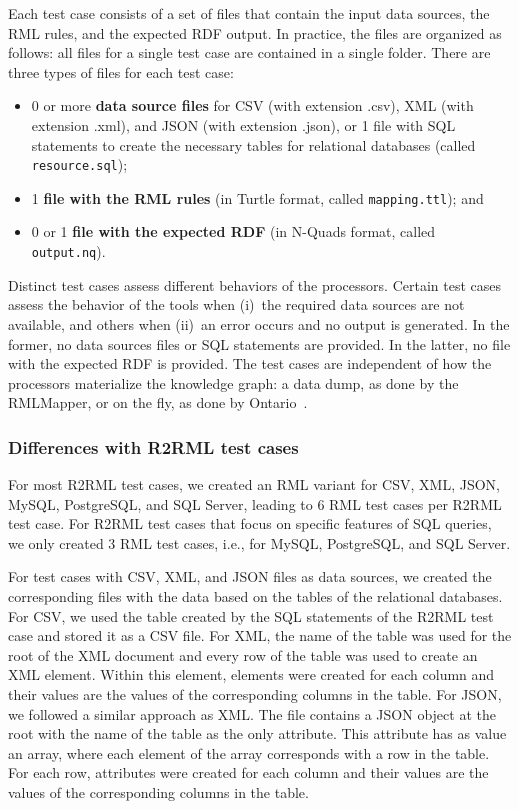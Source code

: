 Each test case consists of a set of files that contain the input data sources, the RML rules, and the expected RDF output. In practice, the files are organized as follows: all files for a single test case are contained in a single folder. There are three types of files for each test case:

\begin{itemize}
  \item 0 or more \textbf{data source files} for CSV (with extension .csv), XML (with extension .xml), and JSON (with extension .json), or 
  1 file with SQL statements to create the necessary tables for relational databases (called \verb|resource.sql|);
  \item 1 \textbf{file with the RML rules} (in Turtle format, called \verb|mapping.ttl|); and
  \item 0 or 1 \textbf{file with the expected RDF} (in N-Quads format, called \verb|output.nq|).
\end{itemize}

Distinct test cases assess different behaviors of the processors. Certain test cases assess the behavior of the tools when (i)~the required data sources are not available, and others when (ii)~an error occurs and no output is generated. In the former, no data sources files or SQL statements are provided. In the latter, no file with the expected RDF is provided. The test cases are independent of how the processors materialize the knowledge graph: a data dump, as done by the RMLMapper, or on the fly, as done by Ontario~\citep{endris2019ontario}.

\subsubsection{Differences with R2RML test cases}
For most R2RML test cases, we created an RML variant for CSV, XML, JSON, MySQL, PostgreSQL, and SQL Server, leading to 6 RML test cases per R2RML test case. For R2RML test cases that focus on specific features of SQL queries, we only created 3 RML test cases, i.e., for MySQL, PostgreSQL, and SQL Server.

For test cases with CSV, XML, and JSON files as data sources, we created the corresponding files with the data based on the tables of the relational databases. For CSV, we used the table created by the SQL statements of the R2RML test case and stored it as a CSV file. For XML, the name of the table was used for the root of the XML document and every row of the table was used to create an XML element. Within this element, elements were created for each column and their values are the values of the corresponding columns in the table. For JSON, we followed a similar approach as XML. The file contains a JSON object at the root with the name of the table as the only attribute. This attribute has as value an array, where each element of the array corresponds with a row in the table. For each row, attributes were created for each column and their values are the values of the corresponding columns in the table.

